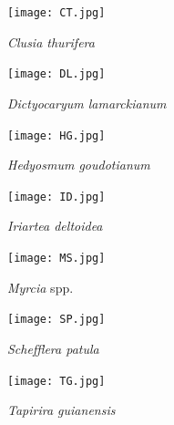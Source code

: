 \documentclass[a4paper,10pt,]{report}
\begin{document}
\begin{figure}[H]
\centering
\begin{minipage}{0.5\textwidth}
\centering
\texttt{[image: CT.jpg]}
\caption{\textit{Clusia thurifera}}
\label{1}
\end{minipage}%
\begin{minipage}{0.5\textwidth}
\centering
\texttt{[image: DL.jpg]}
\caption{\textit{Dictyocaryum lamarckianum}}
\label{2}
\end{minipage}
\end{figure}

\begin{figure}[H]
\centering
\begin{minipage}{0.5\textwidth}
\centering
\texttt{[image: HG.jpg]}
\caption{\textit{Hedyosmum goudotianum}}
\label{1}
\end{minipage}%
\begin{minipage}{0.5\textwidth}
\centering
\texttt{[image: ID.jpg]}
\caption{\textit{Iriartea deltoidea}}
\label{2}
\end{minipage}
\end{figure}

\begin{figure}[H]
\centering
\begin{minipage}{0.5\textwidth}
\centering
\texttt{[image: MS.jpg]}
\caption{\textit{Myrcia} spp.}
\label{1}
\end{minipage}%
\begin{minipage}{0.5\textwidth}
\centering
\texttt{[image: SP.jpg]}
\caption{\textit{Schefflera patula}}
\label{2}
\end{minipage}
\end{figure}

\begin{figure}[H]
\centering
\begin{minipage}{0.5\textwidth}
\centering
\texttt{[image: TG.jpg]}
\caption{\textit{Tapirira guianensis}}
\label{1}
\end{minipage}
\end{figure}
\end{document}
